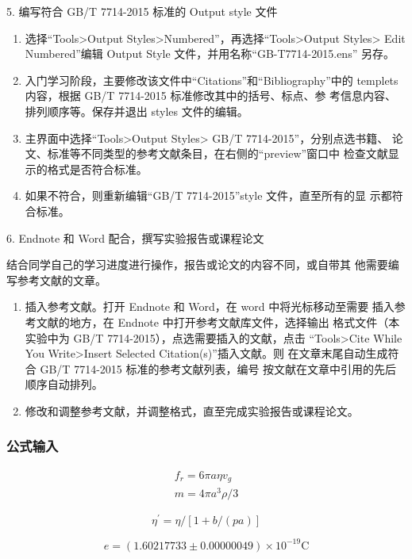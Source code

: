 \documentclass[12pt,a4paper,UTF8]{ctexart}
\begin{document}
	5. 编写符合 GB/T 7714-2015 标准的 Output style 文件
	
	\begin{enumerate}[(1)]
		\item 选择“Tools>Output Styles>Numbered”，再选择“Tools>Output Styles> Edit
		Numbered”编辑 Output Style 文件，并用名称“GB-T7714-2015.ens”
		另存。
		\item 入门学习阶段，主要修改该文件中“Citations”和“Bibliography”中的
		templets 内容，根据 GB/T 7714-2015 标准修改其中的括号、标点、参
		考信息内容、排列顺序等。保存并退出 styles 文件的编辑。
		\item 主界面中选择“Tools>Output Styles> GB/T 7714-2015”，分别点选书籍、
		论文、标准等不同类型的参考文献条目，在右侧的“preview”窗口中
		检查文献显示的格式是否符合标准。
		\item 如果不符合，则重新编辑“GB/T 7714-2015”style 文件，直至所有的显
		示都符合标准。
	\end{enumerate}

	6. Endnote 和 Word 配合，撰写实验报告或课程论文

	结合同学自己的学习进度进行操作，报告或论文的内容不同，或自带其
	他需要编写参考文献的文章。

	\begin{enumerate}[(1)]
		\item 插入参考文献。打开 Endnote 和 Word，在 word 中将光标移动至需要
		插入参考文献的地方，在 Endnote 中打开参考文献库文件，选择输出
		格式文件（本实验中为 GB/T 7714-2015），点选需要插入的文献，点击
		“Tools>Cite While You Write>Insert Selected Citation(s)”插入文献。则
		在文章末尾自动生成符合 GB/T 7714-2015 标准的参考文献列表，编号
		按文献在文章中引用的先后顺序自动排列。
		\item 修改和调整参考文献，并调整格式，直至完成实验报告或课程论文。
	\end{enumerate}


\subsubsection*{公式输入}

\begin{gather}
	f_r=6\pi a \eta v_g   \\
	m=4 \pi a^{3} \rho / 3
\end{gather}

\begin{equation}
	\eta^{\prime}=\eta /[1+b /(p a)]
\end{equation}

\[e=(1.60217733 \pm 0.00000049) \times 10^{-19} \mathrm{C}\]
\end{document}
